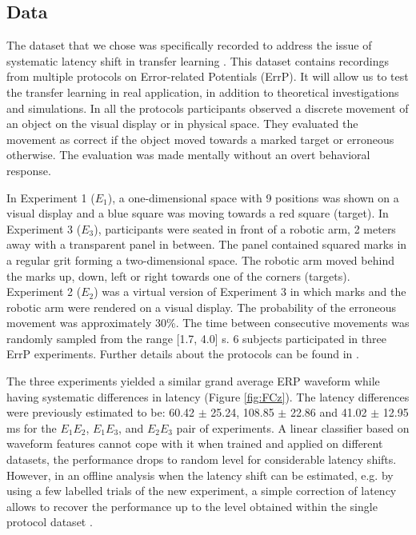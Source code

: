 \documentclass[12pt]{iopart}
\begin{document}
\subsection{Data}

The dataset that we chose was specifically recorded to address 
the issue of systematic latency shift in transfer learning \cite{iturrate_latency_2014-1}.
This dataset contains recordings from multiple protocols
on Error-related Potentials (ErrP). It will allow us to test
the transfer learning in real application, in addition to theoretical
investigations and simulations.
In all the protocols participants observed a discrete movement of an object
on the visual display or in physical space.
They evaluated the movement as correct if the object moved towards a marked target or erroneous 
otherwise. The evaluation was made mentally without an overt behavioral response.

In Experiment 1 ($E_1$), a one-dimensional space with 9 positions was shown on a visual display and
a blue square was moving towards a red square (target). In Experiment 3 ($E_3$), participants were seated
in front of a robotic arm, 2 meters away with a transparent panel in between.
The panel contained squared marks in a regular grit forming a two-dimensional space.
The robotic arm moved behind the marks up, down, left or right 
towards one of the corners (targets).
Experiment 2 ($E_2$) was a virtual version of Experiment 3 in which marks and the robotic arm
were rendered on a visual display.
The probability of the erroneous
movement was approximately 30\%. The time between consecutive movements was randomly sampled
from the range [1.7, 4.0] s. 
6 subjects participated in three ErrP experiments.
Further details about the protocols can be found in \cite{iturrate_latency_2014-1}.

The three experiments yielded a similar grand average ERP waveform 
while having systematic differences in latency (Figure \ref{fig:FCz}).
The latency differences were previously estimated to be:
60.42 $\pm$ 25.24, 108.85 $\pm$ 22.86 and 41.02 $\pm$ 12.95 ms
for the $E_1 E_2$, $E_1 E_3$, and $E_2 E_3$ pair of experiments.
A linear classifier
based on waveform features cannot cope with it when trained and applied
on different datasets, the performance drops to random level
for considerable latency shifts. However, in an offline analysis
when the latency shift can be estimated,
e.g. by using a few labelled trials of the new experiment,
a simple correction of latency allows to recover the performance up to the level
obtained within the single protocol dataset \cite{iturrate_latency_2014-1}.
\end{document}
